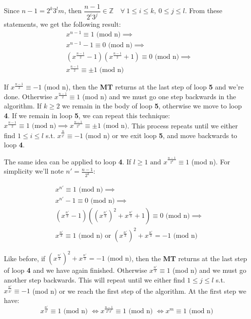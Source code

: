 \documentclass[11pt]{llncs}
\begin{document}
Since $n-1 = 2^k3^lm$, then $\dfrac{n-1}{2^i3^j} \in \mathbb{Z}\quad \forall\ 1 \leq i \leq k,\ 0 \leq j \leq l$. From these statements, we get the following result:
\[ \begin{aligned}
& x^{n-1} \equiv 1 \text{ (mod n)} \implies \\
& x^{n-1} -1 \equiv 0 \text{ (mod n)} \implies \\
& (x^{\frac{n-1}{2}} -1)(x^{\frac{n-1}{2}} +1) \equiv 0 \text{ (mod n)} \implies \\
& x^{\frac{n-1}{2}} \equiv \pm 1 \text{ (mod n)}
\end{aligned} \]

If $x^\frac{n-1}{2} \equiv -1$ (mod n), then the \textbf{MT} returns at the last step of loop \textbf{5} and we're done. Otherwise $x^\frac{n-1}{2} \equiv 1$ (mod n) and we must go one step backwards in the algorithm. If $k \geq 2$ we remain in the body of loop \textbf{5}, otherwise we move to loop \textbf{4}. If we remain in loop \textbf{5}, we can repeat this technique: $x^\frac{n-1}{2} \equiv 1 \text{ (mod n)} \implies x^\frac{n-1}{2^2} \equiv \pm 1 \text{ (mod n)}$. This process repeats until we either find $1 \leq i \leq l$ s.t. $x^\frac{n}{2^i} \equiv -1$ (mod n) or we exit loop \textbf{5}, and move backwards to loop \textbf{4}.

The same idea can be applied to loop \textbf{4}. If $l \geq 1 \text{ and } x^\frac{n-1}{2^k} \equiv 1$ (mod n). For simplicity we'll note $n' = \frac{n-1}{2^k}$:

\[ \begin{aligned}
& x^{n'} \equiv 1 \text{ (mod n)} \implies \\
& x^{n'} -1 \equiv 0 \text{ (mod n)} \implies \\
& (x^\frac{n'}{3} -1)((x^\frac{n'}{3})^2 + x^\frac{n'}{3} + 1) \equiv 0 \text{ (mod n)} \implies \\
& x^\frac{n'}{3} \equiv 1 \text{ (mod n) or } (x^\frac{n'}{3})^2 + x^\frac{n'}{3} = -1 \text{ (mod n)}
\end{aligned} \]

Like before, if $(x^\frac{n'}{3})^2 + x^\frac{n'}{3} = -1 \text{ (mod n)}$, then the \textbf{MT} returns at the last step of loop \textbf{4} and we have again finished. Otherwise $x^\frac{n'}{3} \equiv 1$ (mod n) and we must go another step backwards. This will repeat until we either find $1 \leq j \leq l$ s.t. $x^\frac{n'}{3^j} \equiv -1$ (mod n) or we reach the first step of the algorithm. At the first step we have: \\
\[x^\frac{n'}{3^l} \equiv 1\text{ (mod n) }\iff x^\frac{n-1}{2^k3^l} \equiv 1\text{ (mod n) }\iff x^m \equiv 1\text{ (mod n)}\]
\end{document}
